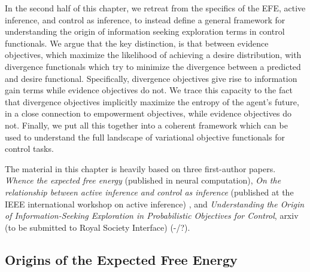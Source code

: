 In the second half of this chapter, we retreat from the specifics of the EFE, active inference, and control as inference, to instead define a general framework for understanding the origin of information seeking exploration terms in control functionals. We argue that the key distinction, is that between evidence objectives, which maximize the likelihood of achieving a desire distribution, with divergence functionals which try to minimize the divergence between a predicted and desire functional. Specifically, divergence objectives give rise to information gain terms while evidence objectives do not. We trace this capacity to the fact that divergence objectives implicitly maximize the entropy of the agent's future, in a close connection to empowerment objectives, while evidence objectives do not. Finally, we put all this together into a coherent framework which can be used to understand the full landscape of variational objective functionals for control tasks.

The material in this chapter is heavily based on three first-author papers. \emph{Whence the expected free energy} \citep{millidge2020whence} (published in neural computation), \emph{On the relationship between active inference and control as inference} (published at the IEEE international workshop on active inference) \citep{millidge2020relationship}, and \emph{Understanding the Origin of Information-Seeking Exploration in Probabilistic Objectives for Control}, arxiv (to be submitted to Royal Society Interface) (-/?).

\subsection{Origins of the Expected Free Energy}

